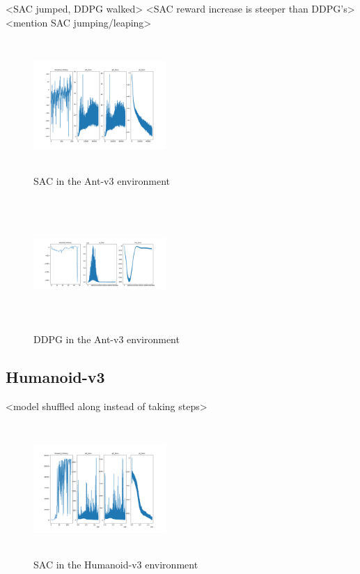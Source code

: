 \documentclass[conference]{IEEEtran}
\begin{document}
<SAC jumped, DDPG walked>
<SAC reward increase is steeper than DDPG's>
<mention SAC jumping/leaping>

\begin{figure}
    \includegraphics[width=0.45\textwidth, height=5cm]{sac-ant}
    \caption{SAC in the Ant-v3 environment}
\end{figure}

\begin{figure}
    \includegraphics[width=0.45\textwidth, height=5cm]{ddpg-ant}
    \caption{DDPG in the Ant-v3 environment}
\end{figure}

\blindtext

\subsection{Humanoid-v3}

<model shuffled along instead of taking steps>

\begin{figure}
    \includegraphics[width=0.45\textwidth, height=5cm]{sac-humanoid}
    \caption{SAC in the Humanoid-v3 environment}
\end{figure}
\end{document}
